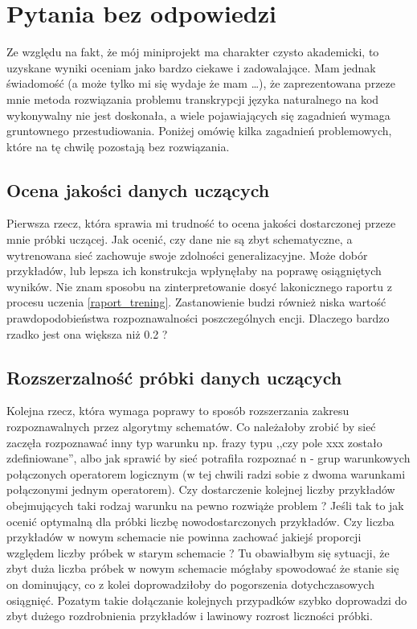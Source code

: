 \section{Pytania bez odpowiedzi}
Ze względu na fakt, że mój miniprojekt ma charakter czysto akademicki, to uzyskane wyniki oceniam jako bardzo ciekawe i zadowalające. Mam jednak świadomość (a może tylko mi się wydaje że mam \dots), że zaprezentowana przeze mnie metoda rozwiązania problemu transkrypcji języka naturalnego na kod wykonywalny nie jest doskonała, a wiele pojawiających się zagadnień wymaga gruntownego przestudiowania. Poniżej omówię kilka zagadnień problemowych, które na tę chwilę pozostają bez rozwiązania. 
\subsection{Ocena jakości danych uczących}
Pierwsza rzecz, która sprawia mi trudność to ocena jakości dostarczonej przeze mnie próbki uczącej. Jak ocenić, czy dane nie są zbyt schematyczne, a wytrenowana sieć zachowuje swoje zdolności generalizacyjne. Może dobór przykładów, lub lepsza ich konstrukcja wpłynęłaby na poprawę osiągniętych wyników. Nie znam sposobu na zinterpretowanie dosyć lakonicznego raportu z procesu uczenia \ref{raport_trening}. Zastanowienie budzi również niska wartość prawdopodobieństwa rozpoznawalności poszczególnych encji. Dlaczego bardzo rzadko jest ona większa niż 0.2 ?
\subsection{Rozszerzalność próbki danych uczących }
Kolejna rzecz, która wymaga poprawy to sposób rozszerzania zakresu rozpoznawalnych przez algorytmy schematów. Co należałoby zrobić by sieć zaczęła rozpoznawać inny typ warunku np. frazy typu ,,czy pole xxx zostało zdefiniowane'', albo jak sprawić by sieć potrafiła rozpoznać n - grup warunkowych połączonych operatorem logicznym (w tej chwili radzi sobie z dwoma warunkami połączonymi jednym operatorem). Czy dostarczenie kolejnej liczby przykładów obejmujących taki rodzaj warunku na pewno rozwiąże problem ? Jeśli tak to jak ocenić optymalną dla próbki liczbę nowodostarczonych przykładów. Czy liczba przykładów w nowym schemacie nie powinna zachować jakiejś proporcji względem liczby próbek w starym schemacie ? Tu obawiałbym się sytuacji, że zbyt duża liczba próbek w nowym schemacie mógłaby spowodować że stanie się on dominujący, co z kolei doprowadziłoby do pogorszenia dotychczasowych osiągnięć. Pozatym takie dołączanie kolejnych przypadków szybko doprowadzi do zbyt dużego rozdrobnienia przykładów i lawinowy rozrost liczności próbki.
